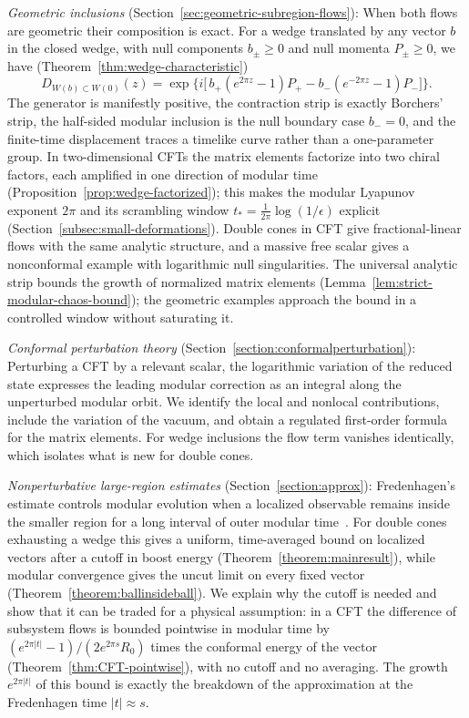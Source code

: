 \documentclass[a4paper,11pt]{article}
\theoremstyle{definition}
\begin{document}
\emph{Geometric inclusions} (Section~\ref{sec:geometric-subregion-flows}): When both flows are geometric their composition is exact. For a wedge translated by any vector $b$ in the closed wedge, with null components $b_\pm\ge0$ and null momenta $P_\pm\ge0$, we have (Theorem~\ref{thm:wedge-characteristic})
\begin{equation}
 D_{W(b)\subset W(0)}(z)=\exp\Big\{i\big[\,b_+(e^{2\pi z}-1)P_+-b_-(e^{-2\pi z}-1)P_-\big]\Big\}.
 \label{eq:intro-wedge}
\end{equation}
The generator is manifestly positive, the contraction strip is exactly Borchers' strip, the half-sided modular inclusion is the null boundary case $b_-=0$, and the finite-time displacement traces a timelike curve rather than a one-parameter group. In two-dimensional CFTs the matrix elements factorize into two chiral factors, each amplified in one direction of modular time (Proposition~\ref{prop:wedge-factorized}); this makes the modular Lyapunov exponent $2\pi$ and its scrambling window $t_*=\tfrac1{2\pi}\log(1/\epsilon)$ explicit (Section~\ref{subsec:small-deformations}). Double cones in CFT give fractional-linear flows with the same analytic structure, and a massive free scalar gives a nonconformal example with logarithmic null singularities. The universal analytic strip bounds the growth of normalized matrix elements (Lemma~\ref{lem:strict-modular-chaos-bound}); the geometric examples approach the bound in a controlled window without saturating it.

\emph{Conformal perturbation theory} (Section~\ref{section:conformalperturbation}): Perturbing a CFT by a relevant scalar, the logarithmic variation of the reduced state expresses the leading modular correction as an integral along the unperturbed modular orbit. We identify the local and nonlocal contributions, include the variation of the vacuum, and obtain a regulated first-order formula for the matrix elements. For wedge inclusions the flow term vanishes identically, which isolates what is new for double cones.

\emph{Nonperturbative large-region estimates} (Section~\ref{section:approx}): Fredenhagen's estimate controls modular evolution when a localized observable remains inside the smaller region for a long interval of outer modular time~\cite{fredenhagen}. For double cones exhausting a wedge this gives a uniform, time-averaged bound on localized vectors after a cutoff in boost energy (Theorem~\ref{theorem:mainresult}), while modular convergence gives the uncut limit on every fixed vector (Theorem~\ref{theorem:ballinsideball}). We explain why the cutoff is needed and show that it can be traded for a physical assumption: in a CFT the difference of subsystem flows is bounded pointwise in modular time by $(e^{2\pi|t|}-1)/(2e^{2\pi s}R_0)$ times the conformal energy of the vector (Theorem~\ref{thm:CFT-pointwise}), with no cutoff and no averaging. The growth $e^{2\pi|t|}$ of this bound is exactly the breakdown of the approximation at the Fredenhagen time $|t|\approx s$.
\end{document}

